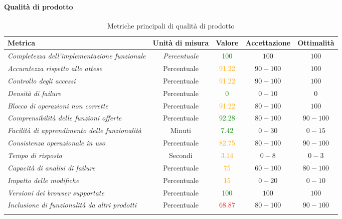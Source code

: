 \paragraph{Qualità di prodotto}
\begin{longtable}{|>{\centering}m{5cm}|c|c|c|c|}
\hline
\textbf{Metrica} & \textbf{Unità di misura} & \textbf{Valore} & \textbf{Accettazione} & \textbf{Ottimalità}\\
\hline
\endhead
\emph{Completezza dell'implementazione funzionale} & \textit{Percentuale} & \textcolor{Green}{100} & $100$ & $100$\\ \hline
\emph{Accuratezza rispetto alle attese} & {Percentuale} & \textcolor{Orange}{91.22} & $90 - 100$ & $100$\\ \hline
\emph{Controllo degli accessi} & {Percentuale} & \textcolor{Orange}{91.22} & $90 - 100$ & $100$\\ \hline
\emph{Densità di failure} & {Percentuale} & \textcolor{Green}{0} & $0 - 10$  & $0$\\ \hline
\emph{Blocco di operazioni non corrette} & {Percentuale} & \textcolor{Orange}{91.22} & $80 - 100$  & $100$\\ \hline
\emph{Comprensibilità delle funzioni offerte} & {Percentuale} & \textcolor{Green}{92.28} & $80 - 100$  & $90 - 100$\\ \hline
\emph{Facilità di apprendimento delle funzionalità} & {Minuti} & \textcolor{Green}{7.42} & $0 - 30$ & $0 - 15$\\ \hline
\emph{Consistenza operazionale in uso} & {Percentuale} & \textcolor{Orange}{82.75} & $80 - 100$ & $90 - 100$\\ \hline
\emph{Tempo di risposta} & {Secondi} & \textcolor{Orange}{3.14} & $0 - 8$ & $0 - 3$\\ \hline
\emph{Capacità di analisi di failure} & {Percentuale} & \textcolor{Orange}{75} & $60 - 100$ & $80 - 100$\\ \hline
\emph{Impatto delle modifiche} & {Percentuale} & \textcolor{Orange}{15} & $0 - 20$ & $0 - 10$\\ \hline
\emph{Versioni dei browser supportate} & {Percentuale} & \textcolor{Green}{100} & $100$ & $100$\\ \hline
\emph{Inclusione di funzionalità da altri prodotti} & {Percentuale} & \textcolor{Red}{68.87} & $80 - 100$ & $90 - 100$\\ \hline
\caption{Metriche principali di qualità di prodotto}
\end{longtable}